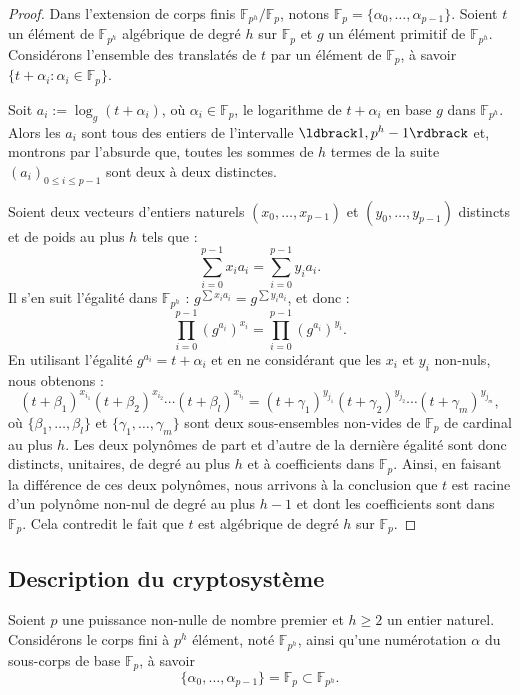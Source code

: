 \documentclass[a4paper, titlepage, 11pt]{article}
\theoremstyle{definition}
\theoremstyle{remark}
\def\gf #1{\mathbb{F}_{#1}}
\newcommand{\extension}[2]{{#1} / {#2}} %
\begin{document}
\begin{proof}
Dans l'extension de corps finis $\extension{\gf{p^h}}{\gf{p}}$, notons $\gf{p} = \{\alpha_0, \dots, \alpha_{p-1} \}$. Soient $t$ un élément de $\gf{p^h}$ algébrique de degré $h$ sur $\gf{p}$ et $g$ un élément primitif de $\gf{p^h}$. Considérons l'ensemble des translatés de $t$ par un élément de $\gf{p}$, à savoir $\{ t + \alpha_i : \alpha_i \in \gf{p} \}$.

Soit $a_i := \log_g(t + \alpha_i)$, où $\alpha_i \in \gf{p}$, le logarithme de $t+\alpha_i$ en base $g$ dans $\gf{p^h}$. Alors les $a_i$ sont tous des entiers de l'intervalle $\ldbrack1, p^h -1\rdbrack$ et, montrons par l'absurde que, toutes les sommes de $h$ termes de la suite ${(a_i)}_{0\leqslant i \leqslant p-1}$ sont deux à deux distinctes.

Soient deux vecteurs d'entiers naturels $(x_0, \dots, x_{p-1})$ et $(y_0, \dots, y_{p-1})$ distincts et de poids au plus $h$ tels que :
$$\sum_{i=0}^{p-1}x_ia_i = \sum_{i=0}^{p-1}y_ia_i.$$
Il s'en suit l'égalité dans $\gf{p^h}$ : $g^{\sum x_ia_i} = g^{\sum y_ia_i}$, et donc :
$$\prod_{i=0}^{p-1} {\left({g^{a_i}}\right)}^{x_i} = \prod_{i=0}^{p-1} {\left({g^{a_i}}\right)}^{y_i}.$$
En utilisant l'égalité $g^{a_i} = t + \alpha_i$ et en ne considérant que les $x_i$ et $y_i$ non-nuls, nous obtenons :
$$(t+\beta_1)^{x_{i_1}}(t+\beta_2)^{x_{i_2}} \cdots (t+\beta_l)^{x_{i_l}} = (t+\gamma_1)^{y_{j_1}}(t+\gamma_2)^{y_{j_2}} \cdots (t+\gamma_m)^{y_{j_m}},$$
où $\{\beta_1, \dots, \beta_l \}$ et $\{ \gamma_1, \dots, \gamma_m\}$ sont deux sous-ensembles non-vides de $\gf{p}$ de cardinal au plus $h$. Les deux polynômes de part et d'autre de la dernière égalité sont donc distincts, unitaires, de degré au plus $h$ et à coefficients dans $\gf{p}$. Ainsi, en faisant la différence de ces deux polynômes, nous arrivons à la conclusion que $t$ est racine d'un polynôme non-nul de degré au plus $h-1$ et dont les coefficients sont dans $\gf{p}$. Cela contredit le fait que $t$ est algébrique de degré $h$ sur $\gf{p}$.
\end{proof}

\subsection{Description du cryptosystème}

Soient $p$ une puissance non-nulle de nombre premier et $h \geqslant 2$ un entier naturel. Considérons le corps fini à $p^h$ élément, noté $\gf{p^h}$, ainsi qu'une numérotation $\alpha$ du sous-corps de base $\gf{p}$, à savoir $$\{\alpha_0,\dots, \alpha_{p-1}\} = \gf{p} \subset \gf{p^h}.$$
\end{document}

